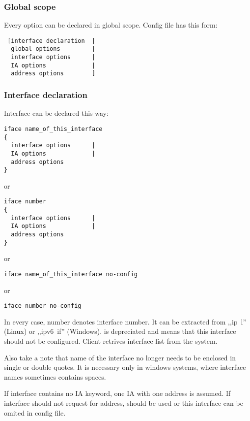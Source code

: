 \subsubsection{Global scope}

Every option can be declared in global scope.
Config file has this form:

\begin{verbatim}
 [interface declaration	 |
  global options         |
  interface options      |
  IA options             |
  address options        ]
\end{verbatim}

\subsubsection{Interface declaration}

Interface can be declared this way:
\begin{verbatim}
iface name_of_this_interface
{
  interface options      |
  IA options             |
  address options        
}
\end{verbatim}

or 

\begin{verbatim}
iface number 
{
  interface options      |
  IA options             |
  address options        
}
\end{verbatim}

or
\begin{verbatim}
iface name_of_this_interface no-config
\end{verbatim}

or 
\begin{verbatim}
iface number no-config
\end{verbatim}

In every case, number denotes interface number. It can be extracted
from ,,ip~l'' (Linux) or ,,ipv6~if'' (Windows).  is
depreciated and means that this interface should not be
configured. Client retrives interface list from the system. 

Also take a note that name of the interface no longer needs to be
enclosed in single or double quotes. It is necessary only in windows
systems, where interface names sometimes contains spaces.

If interface contains no IA keyword, one IA with one address is
assumed. If interface should not request for address, 
should be used or this interface can be omited in config file.

